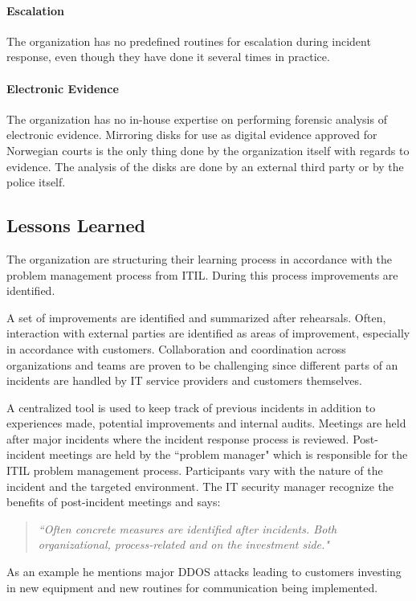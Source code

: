 \paragraph{Escalation}
The organization has no predefined routines for escalation during incident response, even though they have done it several times in practice.

\paragraph{Electronic Evidence}
The organization has no in-house expertise on performing forensic analysis of electronic evidence. Mirroring disks for use as digital evidence approved for Norwegian courts is the only thing done by the organization itself with regards to evidence. The analysis of the disks are done by an external third party or by the police itself.

\subsection{Lessons Learned}
The organization are structuring their learning process in accordance with the problem management process from ITIL. During this process improvements are identified. 

A set of improvements are identified and summarized after rehearsals. Often, interaction with external parties are identified as areas of improvement, especially in accordance with customers. Collaboration and coordination across organizations and teams are proven to be challenging since different parts of an incidents are handled by IT service providers and customers themselves. 

A centralized tool is used to keep track of previous incidents in addition to experiences made, potential improvements and internal audits. Meetings are held after major incidents where the incident response process is reviewed. Post-incident meetings are held by the ``problem manager" which is responsible for the ITIL problem management process. Participants vary with the nature of the incident and the targeted environment. The IT security manager recognize the benefits of post-incident meetings and says:
\begin{quote}
\textit{``Often concrete measures are identified after incidents. Both organizational, process-related and on the investment side."}
\end{quote}
As an example he mentions major DDOS attacks leading to customers investing in new equipment and new routines for communication being implemented. 

